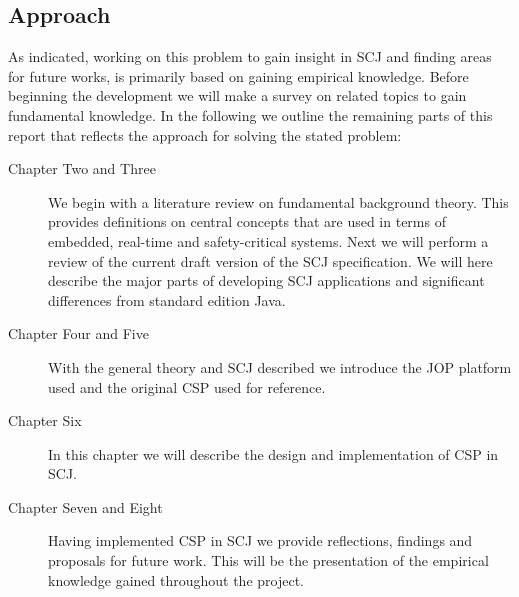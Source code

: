 \subsection{Approach} %
\label{sub:method}
As indicated, working on this problem to gain insight in SCJ and finding areas for future works, is primarily based on gaining empirical knowledge. Before beginning the development we will make a survey on related topics to gain fundamental knowledge. In the following we outline the remaining parts of this report that reflects the approach for solving the stated problem:
\begin{description}
	\item[Chapter Two and Three] We begin with a literature review on fundamental background theory. This provides definitions on central concepts that are used in terms of embedded, real-time and safety-critical systems. Next we will perform a review of the current draft version of the SCJ specification. We will here describe the major parts of developing SCJ applications and significant differences from standard edition Java.
	\item[Chapter Four and Five] With the general theory and SCJ described we introduce the JOP platform used and the original CSP used for reference.
	\item[Chapter Six]  In this chapter we will describe the design and implementation of CSP in SCJ.
	\item[Chapter Seven and Eight] Having implemented CSP in SCJ we provide reflections, findings and proposals for future work. This will be the presentation of the empirical knowledge gained throughout the project.
\end{description}



